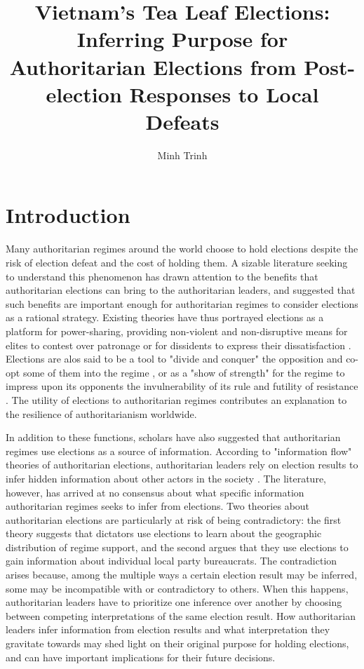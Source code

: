 \documentclass[12pt]{article}\usepackage[]{graphicx}\usepackage[]{color}
\title{Vietnam's Tea Leaf Elections: \\
	Inferring Purpose for Authoritarian Elections from Post-election Responses to Local Defeats}
\author{Minh Trinh}
\newcommand{\1}{\mathbbm{1}}
\begin{document}
\maketitle

\doublespacing

\section{Introduction}

Many authoritarian regimes around the world choose to hold elections despite the risk of election defeat and the cost of holding them. A sizable literature seeking to understand this phenomenon has drawn attention to the benefits that authoritarian elections can bring to the authoritarian leaders, and suggested that such benefits are important enough for authoritarian regimes to consider elections as a rational strategy. Existing theories have thus portrayed elections as a platform for power-sharing, providing non-violent and non-disruptive means for elites to contest over patronage \citep{LustOkar2006} or for dissidents to express their dissatisfaction \citep{AR2005}. Elections are alos said to be a tool to "divide and conquer" the opposition and co-opt some of them into the regime \citep{LustOkar2005}, or as a "show of strength" for the regime to impress upon its opponents the invulnerability of its rule and futility of resistance \citep{Geddes2005}. The utility of elections to authoritarian regimes contributes an explanation to the resilience of authoritarianism worldwide.

In addition to these functions, scholars have also suggested that authoritarian regimes use elections as a source of information. According to "information flow" theories of authoritarian elections, authoritarian leaders rely on election results to infer hidden information about other actors in the society \citep[see, for example,][]{Miller2015, Geddes2005, Magaloni2006, Blaydes2008}. The literature, however, has arrived at no consensus about what specific information authoritarian regimes seeks to infer from elections. Two theories about authoritarian elections are particularly at risk of being contradictory: the first theory suggests that dictators use elections to learn about the geographic distribution of regime support, and the second argues that they use elections to gain information about individual local party bureaucrats. The contradiction arises because, among the multiple ways a certain election result may be inferred, some may be incompatible with or contradictory to others.  When this happens, authoritarian leaders have to prioritize one inference over another by choosing between competing interpretations of the same election result. How authoritarian leaders infer information from election results and what interpretation they gravitate towards may shed light on their original purpose for holding elections, and can have important implications for their future decisions.
\end{document}
